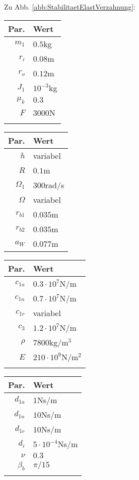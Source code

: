 Zu Abb. \ref{abb:StabilitaetElastVerzahnung}: 
\begin{center}
	\begin{tabular}{r|l}
		Par.&Wert\\\hline
		$m_1$&$0.5$kg\\
		$r_i$&$0.08$m\\
		$r_o$&$0.12$m\\
		$J_1$&$10^{-3}$kg\\
		$\mu_k$& $0.3$\\
		$F$&$3000$N\\
		&
	\end{tabular}\hfill
	\begin{tabular}{r|l}
		Par.&Wert\\\hline
		$h$&variabel\\
		$R$&$0.1$m\\
		$\Omega_1$&$300$rad/s\\
		$\Omega$& variabel \\
		$r_{b1}$&$0.035$m\\
		$r_{b2}$&$0.035$m\\
		$a_{W}$&$0.077$m\\
	\end{tabular}\hfill
	\begin{tabular}{r|l}
		Par.&Wert\\\hline
		$c_{1a}$&$0.3\cdot10^{7}$N/m\\
		$c_{1n}$&$0.7\cdot10^{7}$N/m\\
		$c_{1r}$&variabel\\
		$c_{3}$&$1.2\cdot10^{7}$N/m\\
		$\rho$&$7800$kg/m$^3$\\
		$E$&$210\cdot10^9$N/m$^2$\\
		&
	\end{tabular}\hfill
	\begin{tabular}{r|l}
		Par.&Wert\\\hline
		$d_{1a}$&$1$Ns/m\\
		$d_{1n}$&$10$Ns/m\\
		$d_{1r}$&$10$Ns/m\\
		$d_i$ &$5\cdot10^{-4}$Ns/m\\
		$\nu$&$0.3$\\
		$\beta_b$&$\pi/15$\\
		&
	\end{tabular}
\end{center}

